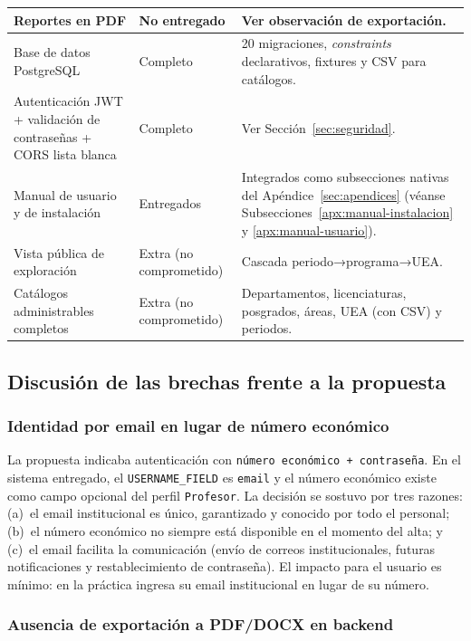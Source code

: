 \begin{longtable}{p{} p{} p{}}
    \midrule
    Reportes en PDF & No entregado & Ver observación de exportación. \\
    \midrule
    Base de datos PostgreSQL & Completo & 20 migraciones, \emph{constraints} declarativos, fixtures y CSV para catálogos. \\
    \midrule
    Autenticación JWT + validación de contraseñas + CORS lista blanca & Completo & Ver Sección~\ref{sec:seguridad}. \\
    \midrule
    Manual de usuario y de instalación & Entregados & Integrados como subsecciones nativas del Apéndice~\ref{sec:apendices} (véanse Subsecciones~\ref{apx:manual-instalacion} y \ref{apx:manual-usuario}). \\
    \midrule
    Vista pública de exploración & Extra (no comprometido) & Cascada periodo→programa→UEA. \\
    \midrule
    Catálogos administrables completos & Extra (no comprometido) & Departamentos, licenciaturas, posgrados, áreas, UEA (con CSV) y periodos. \\
    \bottomrule
\end{longtable}

\subsection{Discusión de las brechas frente a la propuesta}

\subsubsection{Identidad por email en lugar de número económico}

La propuesta indicaba autenticación con \texttt{número económico + contraseña}. En el sistema entregado, el \texttt{USERNAME\_FIELD} es \texttt{email} y el número económico existe como campo opcional del perfil \texttt{Profesor}. La decisión se sostuvo por tres razones: (a)~el email institucional es único, garantizado y conocido por todo el personal; (b)~el número económico no siempre está disponible en el momento del alta; y (c)~el email facilita la comunicación (envío de correos institucionales, futuras notificaciones y restablecimiento de contraseña). El impacto para el usuario es mínimo: en la práctica ingresa su email institucional en lugar de su número.

\subsubsection{Ausencia de exportación a PDF/DOCX en backend}

